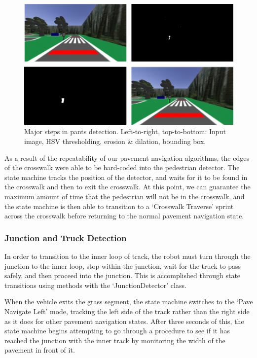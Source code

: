 \documentclass[titlepage, twocolumn]{article}
\begin{document}
            \begin{figure}
                \centering
                \includegraphics[width=0.8\linewidth]{pants.png}
                \caption{Major steps in pants detection. Left-to-right, top-to-bottom: Input image, HSV thresholding, erosion \& dilation, bounding box.}
                \label{fig:pants}
            \end{figure}

            As a result of the repeatability of our pavement navigation algorithms, the edges of the crosswalk were able to be hard-coded into the pedestrian detector. The state machine tracks the position of the detector, and waits for it to be found in the crosswalk and then to exit the crosswalk. At this point, we can guarantee the maximum amount of time that the pedestrian will not be in the crosswalk, and the state machine is then able to transition to a `Crosswalk Traverse' sprint across the crosswalk before returning to the normal pavement navigation state. 
            
        \subsubsection{Junction and Truck Detection}
            In order to transition to the inner loop of track, the robot must turn through the junction to the inner loop, stop within the junction, wait for the truck to pass safely, and then proceed into the junction. This is accomplished through state transitions using methods with the `JunctionDetector' class.

            When the vehicle exits the grass segment, the state machine switches to the `Pave Navigate Left' mode, tracking the left side of the track rather than the right side as it does for other pavement navigation states. After three seconds of this, the state machine begins attempting to go through a procedure to see if it has reached the junction with the inner track by monitoring the width of the pavement in front of it. 
            
\end{document}
